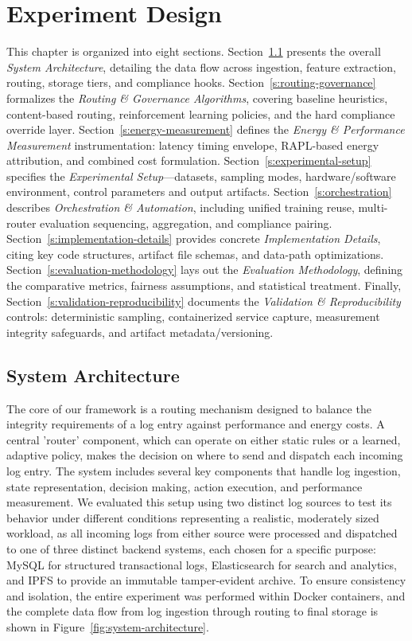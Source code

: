 \chapter{Experiment Design}\label{ch:experiment-design}

This chapter is organized into eight sections. Section~\ref{s:architecture-design} presents the overall \emph{System Architecture}, detailing the data flow across ingestion, feature extraction, routing, storage tiers, and compliance hooks. Section~\ref{s:routing-governance} formalizes the \emph{Routing \& Governance Algorithms}, covering baseline heuristics, content-based routing, reinforcement learning policies, and the hard compliance override layer. Section~\ref{s:energy-measurement} defines the \emph{Energy \& Performance Measurement} instrumentation: latency timing envelope, RAPL-based energy attribution, and combined cost formulation. Section~\ref{s:experimental-setup} specifies the \emph{Experimental Setup}—datasets, sampling modes, hardware/software environment, control parameters and output artifacts. Section~\ref{s:orchestration} describes \emph{Orchestration \& Automation}, including unified training reuse, multi-router evaluation sequencing, aggregation, and compliance pairing. Section~\ref{s:implementation-details} provides concrete \emph{Implementation Details}, citing key code structures, artifact file schemas, and data-path optimizations. Section~\ref{s:evaluation-methodology} lays out the \emph{Evaluation Methodology}, defining the comparative metrics, fairness assumptions, and statistical treatment. Finally, Section~\ref{s:validation-reproducibility} documents the \emph{Validation \& Reproducibility} controls: deterministic sampling, containerized service capture, measurement integrity safeguards, and artifact metadata/versioning.
\section{System Architecture}\label{s:architecture-design}

The core of our framework is a routing mechanism designed to balance the integrity requirements of a log entry against performance and energy costs. A central 'router' component, which can operate on either static rules or a learned, adaptive policy, makes the decision on where to send and dispatch each incoming log entry. The system includes several key components that handle log ingestion, state representation, decision making, action execution, and performance measurement. We evaluated this setup using two distinct log sources to test its behavior under different conditions representing a realistic, moderately sized workload, as all incoming logs from either source were processed and dispatched to one of three distinct backend systems, each chosen for a specific purpose: MySQL for structured transactional logs, Elasticsearch for search and analytics, and IPFS to provide an immutable tamper-evident archive. To ensure consistency and isolation, the entire experiment was performed within Docker containers, and the complete data flow from log ingestion through routing to final storage is shown in Figure~\ref{fig:system-architecture}.

